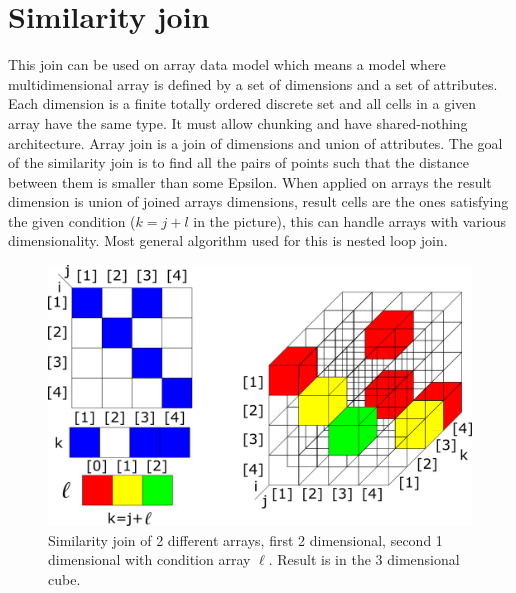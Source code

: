 \section{Similarity join}
This join can be used on array data model which means a model where multidimensional array is defined by a set of dimensions and a set of attributes. Each dimension is a finite totally ordered discrete set and all cells in a given array have the same type. It must allow chunking and have shared-nothing architecture. Array join is a join of dimensions and union of attributes. The goal of the similarity join is to find all the pairs of points such that the distance between them is smaller than some Epsilon.
When applied on arrays the result dimension is union of joined arrays dimensions, result cells are the ones satisfying the given condition ($k=j+l$ in the picture), this can handle arrays with various dimensionality. Most general algorithm used for this is nested loop join. \cite{simJoin}
\begin{figure}
\centering
\includegraphics[scale=0.4]{simjoin.png}
\caption{Similarity join of 2 different arrays, first 2 dimensional, second 1 dimensional with condition array $\ell$. Result is in the 3 dimensional cube.}
\end{figure}



